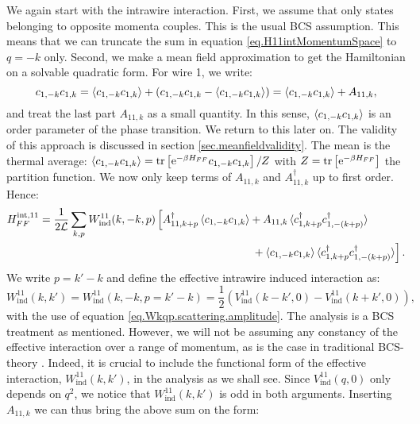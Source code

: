 We again start with the intrawire interaction. First, we assume that only states belonging to opposite momenta couples. This is the usual BCS assumption. This means that we can truncate the sum in equation \eqref{eq.H11intMomentumSpace} to $q = -k$ only. Second, we make a mean field approximation to get the Hamiltonian on a solvable quadratic form. For wire 1, we write:
\begin{equation}
c_{1, -k}c_{1, k} = \braket{ c_{1, -k}c_{1, k} } + \left(c_{1, -k} c_{1, k} - \braket{ c_{1, -k}c_{1, k} } \right) = \braket{ c_{1, -k}c_{1, k} } + A_{11,k}, \nonumber 
\end{equation}
and treat the last part $A_{11,k}$ as a small quantity. In this sense, $\braket{ c_{1, -k}c_{1, k} }$ is an order parameter of the phase transition. We return to this later on. The validity of this approach is discussed in section \ref{sec.meanfieldvalidity}. The mean is the thermal average: $\braket{ c_{1, -k}c_{1, k} } = \operatorname{tr}\left[\text{e}^{-\beta H_{FF}}c_{1, -k}c_{1, k} \right]/Z$ with $Z = \operatorname{tr}\left[\text{e}^{-\beta H_{FF}}\right]$ the partition function. We now only keep terms of $A_{11,k}$ and $A^\dagger_{11,k}$ up to first order. Hence:
\begin{align}
H^\text{int,11}_{FF} = \frac{1}{2\mathcal{L}} \sum_{k, p} W^{11}_{\text{ind}}(k, -k, p) & \left[A^\dagger_{11, k + p}\braket{c_{1, -k}c_{1,k}} + A_{11, k}\braket{c^\dagger_{1, k + p}c^\dagger_{1, -(k+p)}} \right. \nonumber \\
& \left. \phantom{\left[A^\dagger_{11, k + p}\braket{c_{1, -k}c_{1,k}}\right.} + \braket{c_{1, -k}c_{1,k}}\braket{c^\dagger_{1, k + p}c^\dagger_{1, -(k + p)}}\right]. 
\label{eq.H11int.meanfield.firstexpression}
\end{align}
We write $p = k' - k$ and define the effective intrawire induced interaction as:
\begin{equation}
W^{11}_{\text{ind}}(k, k') = W^{11}_{\text{ind}}(k, -k, p = k' - k) = \frac{1}{2}\left(V^{11}_{\text{ind}}\left( k - k', 0 \right) - V^{11}_{\text{ind}}\left( k + k', 0 \right) \right), 
\label{eq.EffectiveInteraction.intrawire}
\end{equation}
with the use of equation \eqref{eq.Wkqp.scattering.amplitude}. The analysis is a BCS treatment as mentioned. However, we will not be assuming any constancy of the effective interaction over a range of momentum, as is the case in traditional BCS-theory \cite[chapter 3]{Tinkham}. Indeed, it is crucial to include the functional form of the effective interaction, $W^{11}_{\text{ind}}(k, k')$, in the analysis as we shall see. Since $V^{11}_{\text{ind}}(q,0)$ only depends on $q^2$, we notice that $W^{11}_{\text{ind}}(k, k')$ is odd in both arguments. Inserting $A_{11,k}$ we can thus bring the above sum on the form:
